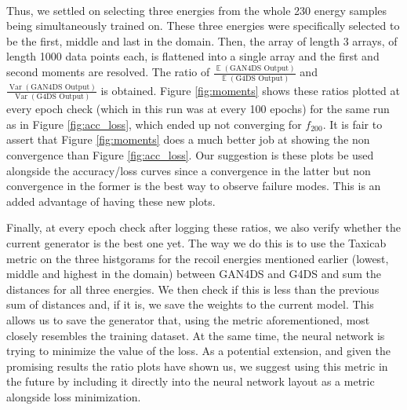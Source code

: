 \documentclass[11pt]{article} %
\DeclareMathOperator{\E}{\mathbb{E}}
\DeclareMathOperator{\Var}{\mathrm{Var}}
\begin{document}
\\
\par Thus, we settled on selecting three energies from the whole 230 energy samples being simultaneously trained on.
These three energies were specifically selected to be the first, middle and last in the domain.
Then, the array of length 3 arrays, of length 1000 data points each, is flattened into a single array and the first and second moments are resolved.
The ratio of $\frac{\E(\text{GAN4DS Output})}{\E(\text{G4DS Output})}$ and $\frac{\Var(\text{GAN4DS Output})}{\Var(\text{G4DS Output})}$ is obtained.
Figure \ref{fig:moments} shows these ratios plotted at every epoch check (which in this run was at every 100 epochs) for the same run
as in Figure \ref{fig:acc_loss}, which ended up not converging for $f_{200}$.
It is fair to assert that Figure \ref{fig:moments} does a much better job at showing the non convergence than Figure \ref{fig:acc_loss}.
Our suggestion is these plots be used alongside the accuracy/loss curves since a convergence in the latter
but non convergence in the former is the best way to observe failure modes.
This is an added advantage of having these new plots.
\\
\par Finally, at every epoch check after logging these ratios, we also verify whether the current generator is the best one yet.
The way we do this is to use the Taxicab metric on the three histgorams for the recoil energies mentioned earlier (lowest, middle and highest in the domain)
between GAN4DS and G4DS and sum the distances for all three energies.
We then check if this is less than the previous sum of distances and, if it is, we save the weights to the current model.
This allows us to save the generator that, using the metric aforementioned, most closely resembles the training dataset.
At the same time, the neural network is trying to minimize the value of the loss.
As a potential extension, and given the promising results the ratio plots have shown us, we
suggest using this metric in the future by including it directly into the neural network layout as a metric alongside loss minimization.
\end{document}
